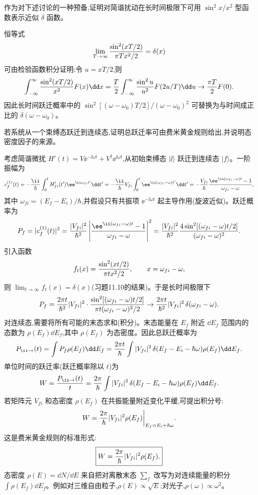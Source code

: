 \begin{question}
作为对下述讨论的一种预备,证明对简谐扰动在长时间极限下可用 $\sin^2 x/x^2$ 型函数表示近似 $\delta$ 函数。
\end{question}
\begin{solution}
恒等式
\[
\lim_{T\to\infty}{\sin^2(xT/2)\over\pi T x^2/2}=\delta(x)
\]
可由检验函数积分证明:令 $u=xT/2$,则
\[
\int_{-\infty}^{\infty}{\sin^2(xT/2)\over x^2}F(x)\dd x
={T\over2}\int_{-\infty}^{\infty}{\sin^2u\over u^2}F(2u/T)\dd u
\to {\pi T\over2}F(0).
\]
因此长时间跃迁概率中的 $\sin^2[(\omega-
\omega_0)T/2]/(
\omega-
\omega_0)^2$ 可替换为与时间成正比的 $\delta(\omega-
\omega_0)$。
\end{solution}

\begin{question}
若系统从一个束缚态跃迁到连续态,证明总跃迁率可由费米黄金规则给出,并说明态密度因子的来源。
\end{question}
\begin{solution}
考虑简谐微扰 $H'(t)=V \ee^{-\ii\omega t}+V^\dagger \ee^{\ii\omega t}$,从初始束缚态 $|\ii\rangle$ 跃迁到连续态 $|f\rangle$。一阶振幅为
\[
c_f^{(1)}(t)=-{\ii\over\hbar}\int_0^t H'_{fi}(t')\ee^{\ii\omega_{fi}t'}\dd t'
=-{\ii\over\hbar}V_{fi}\int_0^t \ee^{\ii(\omega_{fi}-\omega)t'}\dd t'
=-{V_{fi}\over\hbar}{\ee^{\ii(\omega_{fi}-\omega)t}-1\over\omega_{fi}-\omega},
\]
其中 $\omega_{fi}=(E_f-E_i)/\hbar$,并假设只有共振项 $\ee^{-\ii\omega t}$ 起主导作用(旋波近似)。跃迁概率为
\[
P_f=|c_f^{(1)}(t)|^2={|V_{fi}|^2\over\hbar^2}
\left|{\ee^{\ii(\omega_{fi}-\omega)t}-1\over\omega_{fi}-\omega}\right|^2
={|V_{fi}|^2\over\hbar^2}
{4\sin^2[(\omega_{fi}-\omega)t/2]\over(\omega_{fi}-\omega)^2}.
\]
引入函数
\[
f_t(x)={\sin^2(xt/2)\over\pi t x^2/2},\qquad x=\omega_{fi}-\omega,
\]
则 $\lim_{t\to\infty}f_t(x)=\delta(x)$(习题11.10的结果)。于是长时间极限下
\[
P_f={2\pi t\over\hbar^2}|V_{fi}|^2\cdot{\sin^2[(\omega_{fi}-\omega)t/2]\over\pi t(\omega_{fi}-\omega)^2/2}
\to{2\pi t\over\hbar^2}|V_{fi}|^2\,\delta(\omega_{fi}-\omega).
\]
对连续态,需要将所有可能的末态求和(积分)。末态能量在 $E_f$ 附近 $\dd E_f$ 范围内的态数为 $\rho(E_f)\dd E_f$,其中 $\rho(E_f)$ 为态密度。因此总跃迁概率为
\[
P_{\ii\to}(t)=\int P_f\rho(E_f)\dd E_f
={2\pi t\over\hbar}\int|V_{fi}|^2\,\delta(E_f-E_i-\hbar\omega)\rho(E_f)\dd E_f.
\]
单位时间的跃迁率(跃迁概率除以 $t$)为
\[
W={P_{\ii\to}(t)\over t}
={2\pi\over\hbar}\int|V_{fi}|^2\,\delta(E_f-E_i-\hbar\omega)\rho(E_f)\dd E_f.
\]
若矩阵元 $V_{fi}$ 和态密度 $\rho(E_f)$ 在共振能量附近变化平缓,可提出积分号:
\[
W={2\pi\over\hbar}|V_{fi}|^2\rho(E_f)\bigg|_{E_f=E_i+\hbar\omega}.
\]
这是费米黄金规则的标准形式:
\[
\boxed{W={2\pi\over\hbar}|V_{fi}|^2\rho(E_f).}
\]
态密度 $\rho(E)=\dd N/\dd E$ 来自把对离散末态 $\sum_f$ 改写为对连续能量的积分 $\int\rho(E_f)\dd E_f$。例如对三维自由粒子,$\rho(E)\propto\sqrt{E}$;对光子,$\rho(\omega)\propto\omega^2$。
\end{solution}

